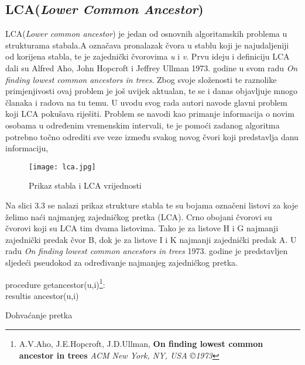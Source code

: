 \documentclass[times, utf8, zavrsni]{fer}
\begin{document}
{\subsection{LCA(\textit{Lower Common Ancestor})}
LCA(\textit{Lower common ancestor}) je jedan od osnovnih algoritamskih problema u strukturama stabala.A označava pronalazak čvora u stablu koji je najudaljeniji od korijena stabla, te je zajednički čvorovima \textit{u} i \textit{v}. Prvu ideju i definiciju LCA dali su Alfred Aho, John Hopcroft i Jeffrey Ullman 1973. godine u svom radu \textit{On finding lowest common ancestors in trees}. Zbog svoje složenosti te raznolike primjenjivosti ovaj problem je još uvijek aktualan, te se i danas objavljuje mnogo članaka i radova na tu temu. U uvodu svog rada autori navode glavni problem koji LCA pokušava riješiti. Problem se navodi kao primanje informacija o novim osobama u određenim vremenskim intervali, te je pomoći zadanog algoritma potrebno točno odrediti sve veze između svakog novog čvori koji predstavlja danu informaciju,
\begin{figure}[!htbp]
	\centering
	\texttt{[image: lca.jpg]}
	\caption{Prikaz stabla i LCA vrijednosti}
	\label{LCA}
\end{figure}

Na slici 3.3 se nalazi prikaz strukture stabla te su bojama označeni listovi za koje želimo naći najmanjeg zajedničkog pretka (LCA). Crno obojani čvorovi su čvorovi koji su LCA tim dvama listovima. Tako je za listove H i G najmanji zajednički predak čvor B, dok je za listove I i K najmanji zajednički predak A. U radu \textit{On finding lowest common ancestors in trees} 1973. godine je predstavljen sljedeći pseudokod za određivanje najmanjeg zajedničkog pretka.
\newline
\newline
\begin{algorithm}[H]
	
	
	procedure getancestor(u,i)\footnote[1]{A.V.Aho, J.E.Hopcroft, J.D.Ullman, \textbf{On finding lowest common ancestor in trees} \textit{ACM New York, NY, USA ©1973}}:\\

	
		resultis ancestor(u,i)\;
	\caption{Dohvaćanje pretka}
	\label{LCA algoritam 1}
\end{algorithm}

}
\end{document}
